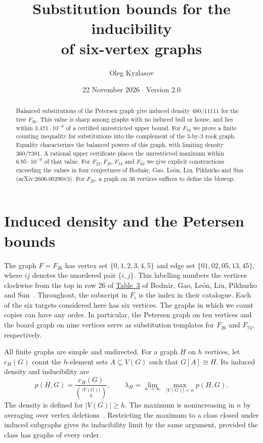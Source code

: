 \documentclass[11pt,a4paper]{article}
\title{\bfseries Substitution bounds for the inducibility\\of six-vertex graphs}
\author{Oleg Kyzlasov}
\date{22 November 2026 \quad $\cdot$ \quad Version 2.0}
\begin{document}
\maketitle
\begin{abstract}
Balanced substitutions of the Petersen graph give induced density \(480/11111\)
for the tree \(F_{26}\). This value is sharp among graphs with no induced bull
or house, and lies within \(3.471\cdot10^{-8}\) of a certified unrestricted upper
bound. For \(F_{74}\) we prove a finite counting inequality for substitutions
into the complement of the \(3\)-by-\(3\) rook graph. Equality characterizes
the balanced powers of this graph, with limiting density \(360/7381\).
A rational upper certificate places the unrestricted maximum within
\(6.95\cdot10^{-9}\) of that value. For \(F_{22},F_{29},F_{34}\) and \(F_{62}\)
we give explicit constructions exceeding the values in four conjectures of
Bodn\'ar, Gao, Le\'on, Liu, Pikhurko and Sun (arXiv:2606.00290v3).
For \(F_{29}\), a graph on 36 vertices suffices to define the blowup.
\end{abstract}

\section{Induced density and the Petersen bounds}
The graph \(F=F_{26}\) has vertex set \(\{0,1,2,3,4,5\}\) and edge set
\(\{01,02,05,13,45\}\), where \(ij\) denotes the unordered pair \(\{i,j\}\).
This labelling numbers the vertices clockwise from the top in row 26 of
\href{https://arxiv.org/html/2606.00290v3#S5.T3}{Table~3} of
Bodn\'ar, Gao, Le\'on, Liu, Pikhurko and Sun~\cite{six}. Throughout,
the subscript in \(F_i\) is the index in their catalogue. Each of the
six targets considered here has six vertices. The graphs in which
we count copies can have any order. In particular, the Petersen graph
on ten vertices and the board graph on nine vertices serve as
substitution templates for \(F_{26}\) and \(F_{74}\), respectively.

All finite graphs are simple and undirected. For a graph \(H\) on \(h\)
vertices, let \(c_H(G)\) count the \(h\)-element sets \(A\subseteq V(G)\)
such that \(G[A]\cong H\). Its induced density and inducibility are
\[
 p(H,G)=\frac{c_H(G)}{\binom{|V(G)|}{h}},\qquad
 \lambda_H=\lim_{n\to\infty}\ \max_{|V(G)|=n}p(H,G).
\]
The density is defined for \(|V(G)|\ge h\). The maximum is nonincreasing in \(n\) by averaging over vertex deletions~\cite{pg}. Restricting the maximum to a class closed under induced subgraphs gives its inducibility limit by the same argument, provided the class has graphs of every order.
\end{document}
